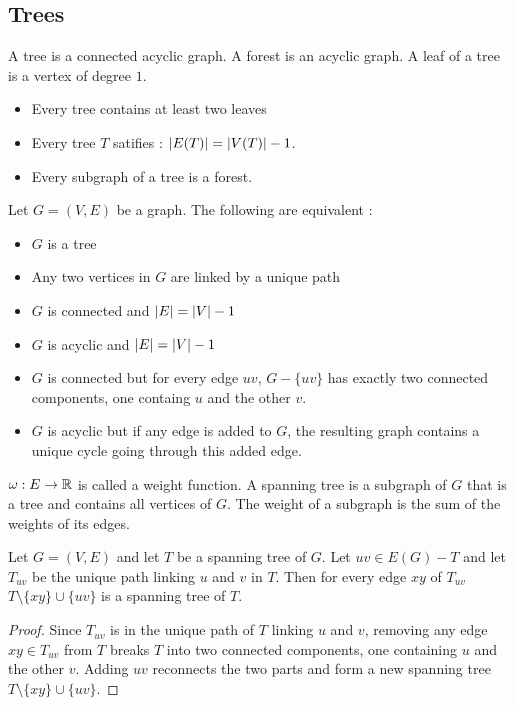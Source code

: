 \documentclass{cours}
\begin{document}
\subsection{Trees}
\begin{definition}
    A tree is a connected acyclic graph. A forest is an acyclic graph. A leaf of a tree is a vertex of degree $1$.
\end{definition}

\begin{proposition}
    \begin{itemize}
        \item Every tree contains at least two leaves
        \item Every tree $T$ satifies : $\left|E(T)\right| = \left|V(T)\right| - 1$.
        \item Every subgraph of a tree is a forest.
    \end{itemize}
\end{proposition}

\begin{proposition}
    Let $G = (V, E)$ be a graph. The following are equivalent :
    \begin{itemize}
        \item $G$ is a tree
        \item Any two vertices in $G$ are linked by a unique path
        \item $G$ is connected and $\left|E\right| = \left|V\right| - 1$
        \item $G$ is acyclic and $\left|E\right| = \left|V\right| - 1$
        \item $G$ is connected but for every edge $uv$, $G - \{uv\}$ has exactly two connected components, one containg $u$ and the other $v$.
        \item $G$ is acyclic but if any edge is added to $G$, the resulting graph contains a unique cycle going through this added edge.
    \end{itemize}
\end{proposition}

\begin{definition}
    $\omega : E \to \mathbb{R}$ is called a weight function. A spanning tree is a subgraph of $G$ that is a tree and contains all vertices of $G$. The weight of a subgraph is the sum of the weights of its edges.
\end{definition}


\begin{proposition}
    Let $G = (V, E)$ and let $T$ be a spanning tree of $G$. Let $uv \in E(G) - T$ and let $T_{uv}$ be the unique path linking $u$ and $v$ in $T$. Then for every edge $xy$ of $T_{uv}$ $T\setminus \{xy\} \cup \{uv\}$ is a spanning tree of $T$.
\end{proposition}
\begin{proof}
    Since $T_{uv}$ is in the unique path of $T$ linking $u$ and $v$, removing any edge $xy \in T_{uv}$ from $T$ breaks $T$ into two connected components, one containing $u$ and the other $v$. Adding $uv$ reconnects the two parts and form a new spanning tree $T \setminus \{xy\} \cup \{uv\}$.
\end{proof}
\end{document}
